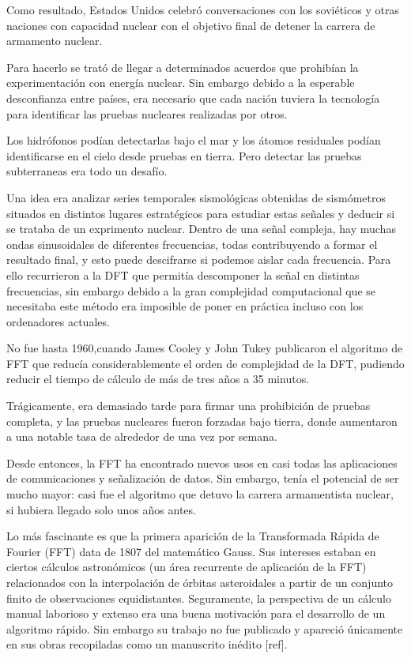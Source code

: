 \noindent Como resultado, Estados Unidos celebró conversaciones con los soviéticos y otras naciones con capacidad nuclear con el objetivo final de detener la carrera de armamento nuclear.

\noindent Para hacerlo se trató de llegar a determinados acuerdos que prohibían la experimentación con energía nuclear. Sin embargo debido a la esperable desconfianza entre países, era necesario que cada nación tuviera la tecnología para identificar las pruebas nucleares realizadas por otros. 

\noindent Los hidrófonos podían detectarlas bajo el mar y los átomos residuales podían identificarse en el cielo desde pruebas en tierra. Pero detectar las pruebas subterraneas era todo un desafío.


\noindent Una idea era analizar series temporales
sismológicas obtenidas de sismómetros situados en distintos lugares estratégicos para estudiar estas señales y deducir si se trataba de un exprimento nuclear.
Dentro de una señal compleja, hay muchas ondas sinusoidales de diferentes frecuencias, todas contribuyendo a formar el resultado final, y esto puede descifrarse si podemos aislar cada frecuencia. Para ello  recurrieron a la DFT que permitía descomponer la señal en distintas frecuencias, sin embargo  debido a la gran complejidad computacional que se necesitaba este método era imposible de poner en práctica incluso con los ordenadores actuales.

\noindent No fue hasta 1960,cuando James Cooley y John Tukey  publicaron el algoritmo de FFT que reducía considerablemente el orden de complejidad de la DFT, pudiendo reducir el tiempo de cálculo de más de tres años a 35 minutos.

\noindent Trágicamente, era demasiado tarde para firmar una prohibición de pruebas completa, y las pruebas nucleares fueron forzadas bajo tierra, donde aumentaron a una notable tasa de alrededor de una vez por semana.

\noindent Desde entonces, la FFT ha encontrado nuevos usos en casi todas las aplicaciones de comunicaciones y señalización de datos. Sin embargo, tenía el potencial de ser mucho mayor: casi fue el algoritmo que detuvo la carrera armamentista nuclear, si hubiera llegado solo unos años antes.


\noindent Lo más fascinante es que la primera aparición de la Transformada Rápida de Fourier (FFT) data de 1807 del matemático Gauss.
Sus intereses estaban en ciertos cálculos astronómicos (un área recurrente de aplicación de la FFT) relacionados con la interpolación de órbitas asteroidales a partir de un conjunto finito de observaciones equidistantes. Seguramente, la perspectiva de un cálculo manual laborioso y extenso era una buena motivación para el desarrollo de un algoritmo rápido. Sin embargo su trabajo no fue publicado y apareció únicamente en sus obras recopiladas como un manuscrito inédito  [ref].

